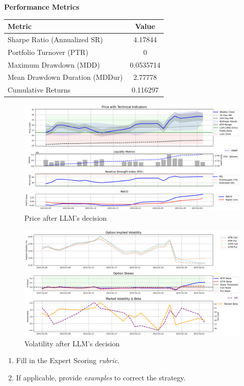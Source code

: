 \documentclass[8pt]{scrartcl}
\begin{document}
\textbf{Performance Metrics}

\begin{longtable}{l c}
\toprule
\textbf{Metric} & \textbf{Value} \\
\midrule
Sharpe Ratio (Annualized SR) & 4.17844 \\
Portfolio Turnover (PTR) & 0 \\
Maximum Drawdown (MDD) & 0.0535714 \\
Mean Drawdown Duration (MDDur) & 2.77778 \\
Cumulative Returns & 0.116297 \\
\bottomrule
\end{longtable}

\begin{figure}[H]
    \centering
    \includegraphics[width=1\linewidth]{judge_reviews/AAPL_M_gpt-4o-mini//2015-01-05/llm_Price_with_Technical_Indicators.png}
    \caption{Price after LLM's decision}
\end{figure}

\begin{figure}[H]
    \centering
    \includegraphics[width=1\linewidth]{judge_reviews/AAPL_M_gpt-4o-mini/2015-01-05/llm_Market_Volatility_&_Beta.png}
    \caption{Volatility after LLM's decision}
\end{figure}

\begin{tcolorbox}[colback=blue!10, colframe=blue!60, title=\textbf{TASKS}, sharp corners=southwest]
\begin{enumerate}
    \item Fill in the Expert Scoring \textit{rubric}.
    \item If applicable, provide \textit{examples} to correct the strategy.
\end{enumerate}
\end{tcolorbox}
\newpage
\end{document}
